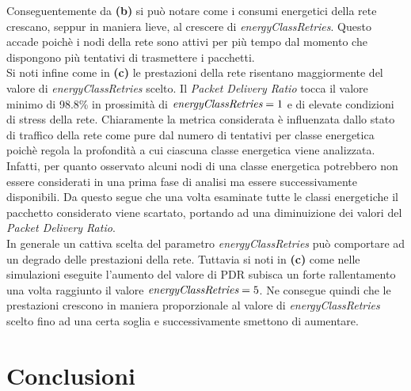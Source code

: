 \documentclass[binding=0.6cm,TFA]{sapthesis}
\begin{document}
Conseguentemente da \textbf{(b)} si può notare come i consumi energetici della rete crescano, seppur in maniera lieve, al crescere di \emph{energyClassRetries}.
Questo accade poichè i nodi della rete sono attivi per più tempo dal momento che dispongono più tentativi di trasmettere i pacchetti.\\

Si noti infine come in \textbf{(c)} le prestazioni della rete risentano maggiormente del valore di \emph{energyClassRetries} scelto. Il \emph{Packet Delivery Ratio}
tocca il valore minimo di 98.8\% in prossimità di $\emph{energyClassRetries}=1$ e di elevate condizioni di stress della rete. Chiaramente la metrica considerata
è influenzata dallo stato di traffico della rete come pure dal numero di tentativi per classe energetica poichè regola la profondità a cui ciascuna classe
energetica viene analizzata. Infatti, per quanto osservato alcuni nodi di una classe energetica potrebbero non essere considerati in una prima fase di analisi
ma essere successivamente disponibili. Da questo segue che una volta esaminate tutte le classi energetiche il pacchetto considerato viene scartato, portando
ad una diminuizione dei valori del \emph{Packet Delivery Ratio}.\\

In generale un cattiva scelta del parametro \emph{energyClassRetries} può comportare ad un degrado delle prestazioni della rete. Tuttavia si noti in \textbf{(c)}
come nelle simulazioni eseguite l'aumento del valore di PDR subisca un forte rallentamento una volta raggiunto il valore $\emph{energyClassRetries}=5$. Ne
consegue quindi che le prestazioni crescono in maniera proporzionale al valore di \emph{energyClassRetries} scelto fino ad una certa soglia e
successivamente smettono di aumentare.

\chapter{Conclusioni}

\backmatter
\cleardoublepage
{} %
\end{document}
